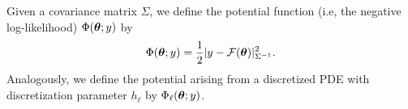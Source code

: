 \noindent Given a covariance matrix $\Sigma$, we define the potential function (i.e, the negative log-likelihood) $\Phi(\bm{\theta};y)$ by  \begin{equation}\label{pot}
\Phi(\bm{\theta};y)=\frac{1}{2}\vert y-\mathcal{F}(\bm{\theta})|^2_{\Sigma^{-1}}.
\end{equation} Analogously, we define the potential arising from a discretized PDE with discretization parameter $h_\ell$ by $\Phi_{\ell}(\bm{\theta};y)$.
%	
